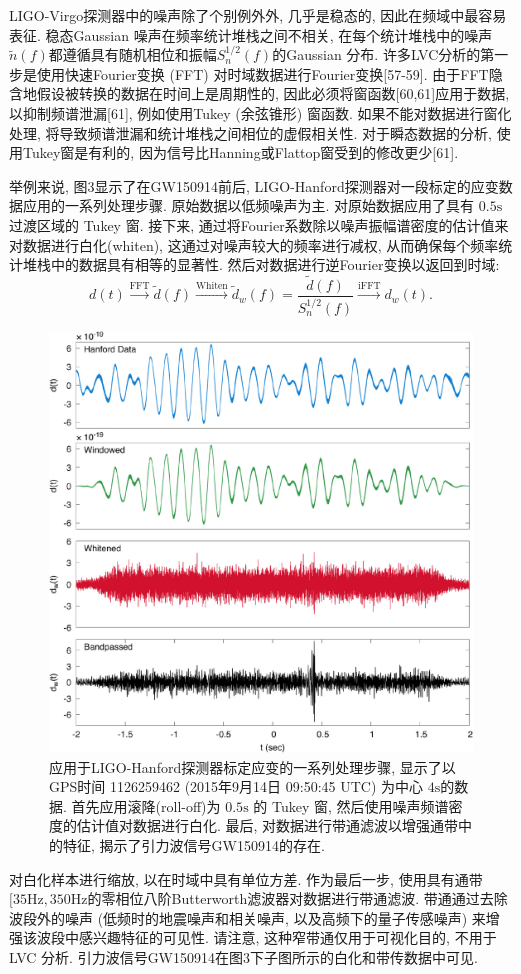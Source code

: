 \documentclass[a4paper]{\documentclassname}
\def\t{\text}
\def\ti{\tilde}
\theoremstyle{definition}
\begin{document}
LIGO-Virgo探测器中的噪声除了个别例外外, 几乎是稳态的, 因此在频域中最容易表征. 稳态Gaussian 噪声在频率统计堆栈之间不相关, 在每个统计堆栈中的噪声$\ti{n}(f)$都遵循具有随机相位和振幅$S_n^{1/2}(f)$的Gaussian 分布. 许多LVC分析的第一步是使用快速Fourier变换 (FFT) 对时域数据进行Fourier变换[57-59]. 由于FFT隐含地假设被转换的数据在时间上是周期性的, 因此必须将窗函数[60,61]应用于数据, 以抑制频谱泄漏[61], 例如使用Tukey (余弦锥形) 窗函数. 如果不能对数据进行窗化处理, 将导致频谱泄漏和统计堆栈之间相位的虚假相关性. 对于瞬态数据的分析, 使用Tukey窗是有利的, 因为信号比Hanning或Flattop窗受到的修改更少[61]. 

举例来说, 图3显示了在GW150914前后, LIGO-Hanford探测器对一段标定的应变数据应用的一系列处理步骤. 原始数据以低频噪声为主. 对原始数据应用了具有 $0.5 \t{s}$ 过渡区域的 Tukey 窗. 接下来, 通过将Fourier系数除以噪声振幅谱密度的估计值来对数据进行白化(whiten), 这通过对噪声较大的频率进行减权, 从而确保每个频率统计堆栈中的数据具有相等的显著性. 然后对数据进行逆Fourier变换以返回到时域:
\begin{equation}
    d(t)\xrightarrow[]{\text{FFT}}\ti{d}(f)\xrightarrow[]{\text{Whiten}}\ti{d}_w(f)=\frac{\ti{d}(f)}{S_n^{1/2}(f)}\xrightarrow[]{\text{iFFT}}d_w(t).
\end{equation}
\begin{figure}[htbp]
    \centering
    \includegraphics{img/3.jpg}
    \caption{
        应用于LIGO-Hanford探测器标定应变的一系列处理步骤, 显示了以GPS时间 1126259462 (2015年9月14日 09:50:45 UTC) 为中心 $4\t{s}$的数据. 首先应用滚降(roll-off)为 $0.5\t{s}$ 的 Tukey 窗, 然后使用噪声频谱密度的估计值对数据进行白化. 最后, 对数据进行带通滤波以增强通带中的特征, 揭示了引力波信号GW150914的存在. 
    }
\end{figure}
对白化样本进行缩放, 以在时域中具有单位方差. 作为最后一步, 使用具有通带$[35 \t{Hz},350 \t{Hz}$的零相位八阶Butterworth滤波器对数据进行带通滤波. 带通通过去除波段外的噪声 (低频时的地震噪声和相关噪声, 以及高频下的量子传感噪声) 来增强该波段中感兴趣特征的可见性. 请注意, 这种窄带通仅用于可视化目的, 不用于 LVC 分析. 引力波信号GW150914在图3下子图所示的白化和带传数据中可见. 
\end{document}
